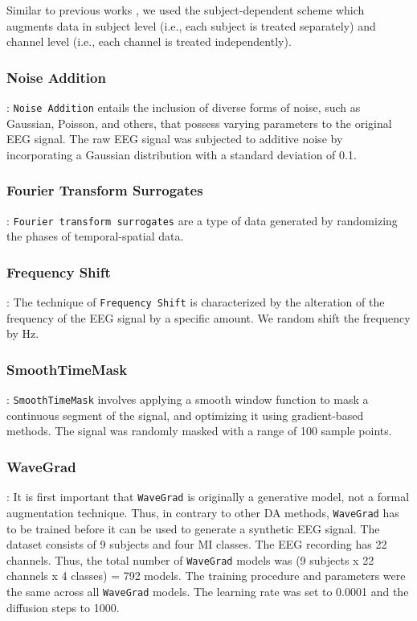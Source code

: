 \documentclass[runningheads]{llncs}
\begin{document}
\begin{sloppypar}
Similar to previous works \cite{rommel2021cadda,mohsenvand2020contrastive,leeb2008bci,terzano2001atlas}, we used the subject-dependent scheme which augments data in subject level (i.e., each subject is treated separately) and channel level (i.e., each channel is treated independently).
\end{sloppypar}

\subsubsection{Noise Addition}: \texttt{Noise Addition} entails the inclusion of diverse forms of noise, such as Gaussian, Poisson, and others, that possess varying parameters to the original EEG signal. The raw EEG signal was subjected to additive noise by incorporating a Gaussian distribution with a standard deviation of 0.1.

\subsubsection{Fourier Transform Surrogates}:
\texttt{Fourier transform surrogates} are a type of data generated by randomizing the phases of temporal-spatial data.


\subsubsection{Frequency Shift}: The technique of \texttt{Frequency Shift} is characterized by the alteration of the frequency of the EEG signal by a specific amount.
We random shift the frequency by  Hz.


\subsubsection{SmoothTimeMask}:
\texttt{SmoothTimeMask} involves applying a smooth window function to mask a continuous segment of the signal, and optimizing it using gradient-based methods. The signal was randomly masked with a range of 100 sample points.

\subsubsection{WaveGrad}:
It is first important that \texttt{WaveGrad} is originally a generative model, not a formal augmentation technique.  Thus, in contrary to other DA methods, \texttt{WaveGrad} has to be trained before it can be used to generate a synthetic EEG signal.   The dataset consists of 9 subjects and four MI classes. The EEG recording has 22 channels. Thus, the total number of \texttt{WaveGrad} models was (9 subjects x 22 channels x 4 classes) = 792 models.  The training procedure and parameters were the same across all \texttt{WaveGrad} models. The learning rate was set to 0.0001 and the diffusion steps to 1000.
\end{document}
